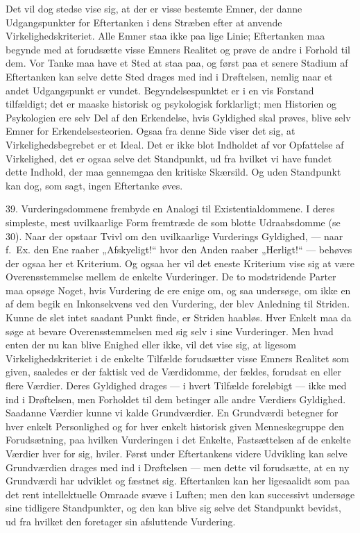 \documentclass[12pt,a4paper]{book}
\newcommand{\opage}[1]{\marginnote{\footnotesize\textit{[#1]}}}
\newcommand{\apage}[1]{\marginnote{\footnotesize\textit{[#1]}}}
\begin{document}
Det vil dog stedse vise sig, at der er visse bestemte Emner, der danne
Udgangspunkter for Eftertanken i dens Stræben efter at anvende
Virkelighedskriteriet. Alle Emner staa ikke paa lige Linie; Eftertanken
maa begynde med at forudsætte visse Emners Realitet og prøve de andre i
Forhold til dem. \apage{107} Vor Tanke maa have et Sted at staa paa, og først paa et
senere Stadium af Eftertanken kan selve dette Sted drages med ind i
Drøftelsen, nemlig naar et andet Udgangspunkt er vundet.
Begyndelsespunktet er i en vis Forstand tilfældigt; det er maaske
historisk og psykologisk forklarligt; men Historien og Psykologien ere
selv Del af den Erkendelse, hvis Gyldighed skal prøves, blive selv Emner
for Erkendelsesteorien. Ogsaa fra denne Side viser det sig, at
Virkelighedsbegrebet er et Ideal. Det er ikke blot Indholdet af vor
Opfattelse af Virkelighed, det er ogsaa selve det Standpunkt, ud fra
hvilket vi have fundet dette Indhold, der maa gennemgaa den kritiske
Skærsild. Og uden Standpunkt kan dog, som sagt, ingen Eftertanke øves.

39. Vurderingsdommene frembyde en Analogi til Existentialdommene. I
deres simpleste, mest uvilkaarlige Form fremtræde de som blotte
Udraabsdomme (se 30). Naar der opstaar Tvivl om den uvilkaarlige
Vurderings Gyldighed, --- naar f.\ Ex. den Ene raaber „Afskyeligt!“ hvor
den Anden raaber „Herligt!“ --- behøves der ogsaa her et Kriterium. Og
ogsaa her vil det eneste Kriterium vise sig at være Overensstemmelse
mellem de enkelte Vurderinger. De to modstridende Parter maa opsøge
Noget, hvis Vurdering de ere enige om, og saa undersøge, om ikke en af
dem begik en Inkonsekvens ved den Vurdering, der blev Anledning til
Striden. Kunne de slet intet saadant Punkt finde, er Striden haabløs.
Hver Enkelt maa da søge at bevare Overensstemmelsen med sig selv i sine
Vurderinger. Men hvad enten der nu kan blive Enighed eller ikke, vil det
vise sig, at ligesom Virkelighedskriteriet i de enkelte Tilfælde
forudsætter visse Emners Realitet som given, saaledes er der faktisk ved
de Værdidomme, der fældes, forudsat en eller flere Værdier. Deres
Gyldighed drages --- i hvert Tilfælde foreløbigt --- ikke med ind i
Drøftelsen, men Forholdet til dem betinger alle andre Værdiers
Gyldighed. Saadanne Værdier kunne vi kalde Grundværdier. En Grundværdi
betegner for hver enkelt Personlighed og for hver enkelt historisk given
Menneskegruppe den Forudsætning, paa hvilken Vurderingen i det
\opage{108}Enkelte,
Fastsættelsen af de enkelte Værdier hver for sig, hviler. Først under
Eftertankens videre Udvikling kan selve Grundværdien drages med ind i
Drøftelsen --- men dette vil forudsætte, at en ny Grundværdi har
udviklet og fæstnet sig. Eftertanken kan her ligesaalidt som paa det
rent intellektuelle Omraade svæve i Luften; men den kan successivt
undersøge sine tidligere Standpunkter, og den kan blive sig selve det
Standpunkt bevidst, ud fra hvilket den foretager sin afsluttende
Vurdering.
\end{document}
